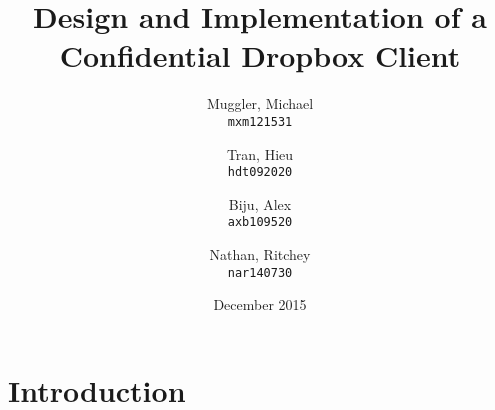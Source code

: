\documentclass[11pt]{article}
\title{Design and Implementation of a Confidential Dropbox Client}
\author{
  Muggler, Michael\\
  \texttt{mxm121531}
  \and
  Tran, Hieu\\
  \texttt{hdt092020}
  \and
  Biju, Alex\\
  \texttt{axb109520}
  \and
  Nathan, Ritchey\\
  \texttt{nar140730}
}
\date{December 2015}
\begin{document}
\maketitle

\section{Introduction}
\end{document}
